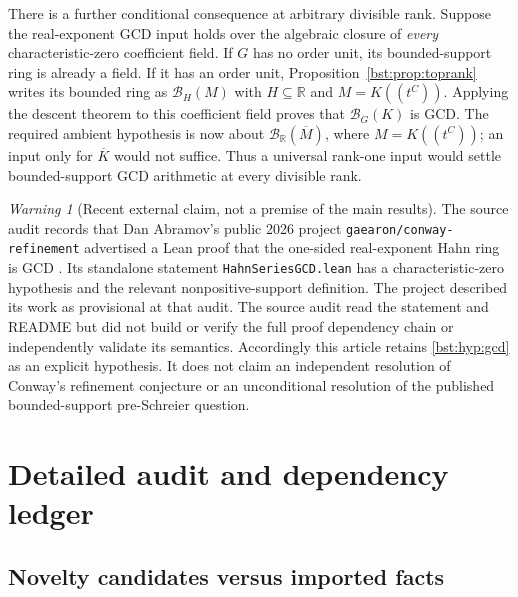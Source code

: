 \documentclass[11pt,letterpaper]{article}
\theoremstyle{definition}
\theoremstyle{remark}
\newtheorem{warning}[theorem]{Warning}
\newcommand{\R}{\mathbb R}
\newcommand{\HH}[2]{#1((t^{#2}))}
\newcommand{\BB}[2]{\mathcal B_{#2}(#1)}
\begin{document}
There is a further conditional consequence at arbitrary divisible rank.
Suppose the real-exponent GCD input holds over the algebraic closure of
\emph{every} characteristic-zero coefficient field. If $G$ has no order
unit, its bounded-support ring is already a field. If it has an order
unit, Proposition~\ref{bst:prop:toprank} writes its bounded ring as
$\BB MH$ with $H\subseteq\R$ and $M=\HH KC$. Applying the descent theorem
to this coefficient field proves that $\BB KG$ is GCD. The required
ambient hypothesis is now about $\BB{\overline M}{\R}$, where
$M=\HH KC$; an input only for $\overline K$ would not suffice. Thus a universal
rank-one input would settle bounded-support GCD arithmetic at every
divisible rank.

\begin{warning}[Recent external claim, not a premise of the main results]
The source audit records that Dan Abramov's public 2026 project
\texttt{gaearon/conway-refinement} advertised a Lean proof that the one-sided real-exponent Hahn ring is GCD
\cite{Abramov}. Its standalone statement
\texttt{HahnSeriesGCD.lean} has a characteristic-zero hypothesis and the
relevant nonpositive-support definition. The project described its work as provisional at that audit.
The source audit read the statement and README but did not
build or verify the full proof dependency chain or independently validate
its semantics. Accordingly this article retains \eqref{bst:hyp:gcd} as an
explicit hypothesis. It does not claim an independent resolution of
Conway's refinement conjecture or an unconditional resolution of the
published bounded-support pre-Schreier question.
\end{warning}

\section{Detailed audit and dependency ledger}\label{bst:sec:audit}

\subsection{Novelty candidates versus imported facts}
\end{document}

